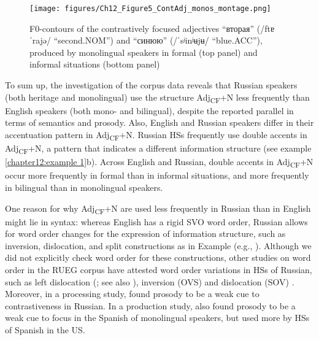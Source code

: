 \documentclass[output=paper,colorlinks,citecolor=brown]{langscibook}
\begin{document}
\begin{figure}
  \centering
  \texttt{[image: figures/Ch12\_Figure5\_ContAdj\_monos\_montage.png]}
  \caption{F0-contours of the contrastively focused adjectives “вторая” (/ftɐˈrajə/ “second.NOM”) and “синюю” (/ˈsʲinʲʉjʉ/ “blue.ACC”), produced by monolingual speakers in formal (top panel) and informal situations (bottom panel)}
  \label{chapter12:fig:5}
\end{figure}

To sum up, the investigation of the corpus data reveals that Russian speakers (both heritage and monolingual) use the structure Adj\textsubscript{CF}+N less frequently than English speakers (both mono- and bilingual), despite the reported parallel in terms of semantics and prosody. Also, English and Russian speakers differ in their accentuation pattern in Adj\textsubscript{CF}+N. Russian HSs frequently use double accents in Adj\textsubscript{CF}+N, a pattern that indicates a different information structure (see example \ref{chapter12:example 1}b). Across English and Russian, double accents in Adj\textsubscript{CF}+N occur more frequently in formal than in informal situations, and more frequently in bilingual than in monolingual speakers.

One reason for why Adj\textsubscript{CF}+N are used less frequently in Russian than in English might lie in syntax: whereas English has a rigid SVO word order, Russian allows for word order changes for the expression of information structure, such as inversion, dislocation, and split constructions as in Example  (e.g., \cite{Jasinskaja_2016}). Although we did not explicitly check word order for these constructions, other studies on word order in the RUEG corpus have attested word order variations in HSs of Russian, such as left dislocation (\cite{Zerbian_Barabashova_Zuban_subm}; see also \cite{chapters/11}), inversion (OVS) and dislocation (SOV) \citep{Zuban_etal_2021}. Moreover, in a processing study, \citet[296]{Sekerina_Trueswell_2011} found prosody to be a weak cue to contrastiveness in Russian. In a production study, \citet{Kim_2019} also found prosody to be a weak cue to focus in the Spanish of monolingual speakers, but used more by HSs of Spanish in the US.
\end{document}
